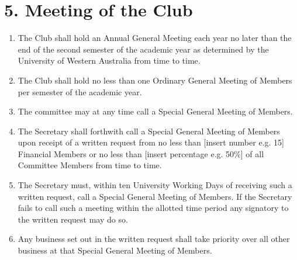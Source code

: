 \documentclass[12pt]{article}
\begin{document}
\section{5. Meeting of the Club}
\begin{enumerate}[label=5.\arabic*]
\item The Club shall hold an Annual General Meeting each year no later than the end of the second semester of the academic year as determined by the University of Western Australia from time to time.
\item The Club shall hold no less than one Ordinary General Meeting of Members per semester of the academic year.
\item The committee may at any time call a Special General Meeting of Members.
\item The Secretary shall forthwith call a Special General Meeting of Members upon receipt of a written request from no less than [insert number e.g. 15] Financial Members or no less than [insert percentage e.g. 50\%] of all Committee Members from time to time.
\item The Secretary must, within ten University Working Days of receiving such a written request, call a Special General Meeting of Members. If the Secretary fails to call such a meeting within the allotted time period any signatory to the written request may do so.
\item Any business set out in the written request shall take priority over all other business at that Special General Meeting of Members.
\end{enumerate}
\end{document}
